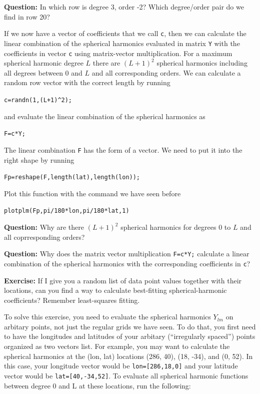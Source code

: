 \documentclass[11pt]{article}
\begin{document}
\textbf{Question:} In which row is degree 3, order -2? Which
degree/order pair do we find in row 20?

If we now have a vector of coefficients that we call \verb+c+, then we
can calculate the linear combination of the spherical harmonics
evaluated in matrix \verb+Y+ with the coefficients in vector \verb+c+
using matrix-vector multiplication. For a maximum spherical harmonic
degree $L$ there are $(L+1)^2$ spherical harmonics including all
degrees between 0 and $L$ and all corresponding orders.  We can
calculate a random row vector with the correct length by running

\quad \verb!c=randn(1,(L+1)^2);!
   
and evaluate the linear combination of the spherical harmonics as

\quad \verb!F=c*Y;!

The linear combination \verb!F! has the form of a vector. We need to
put it into the right shape by running

\quad \verb!Fp=reshape(F,length(lat),length(lon));!

Plot this function with the command we have seen before

\qquad \verb+plotplm(Fp,pi/180*lon,pi/180*lat,1)+

\textbf{Question:} Why are there $(L+1)^2$ spherical harmonics for
degrees 0 to $L$ and all coprresponding orders?

\textbf{Question:} Why does the matrix vector multiplication
\verb!F=c*Y;! calculate a linear combination of the spherical
harmonics with the corresponding coefficients in \verb+c+?


\textbf{Exercise:} If I give you a random list of data point values
together with their locations, can you find a way to calculate
best-fitting spherical-harmonic coefficients? Remember least-squares
fitting.

To solve this exercise, you need to evaluate the spherical harmonics
$Y_{lm}$ on arbitary points, not just the regular grids we have
seen. To do that, you first need to have the longitudes and latitudes
of your arbitary (``irregularly spaced'') points organized as two
vectors list. For example, you may want to calculate the spherical
harmonics at the (lon, lat) locations (286, 40), (18, -34), and (0,
52). In this case, your longitude vector would be
\verb#lon=[286,18,0]# and your latitude vector would be
\verb#lat=[40,-34,52]#. To evaluate all spherical harmonic functions
between degree 0 and L at these locations, run the following:
\end{document}
